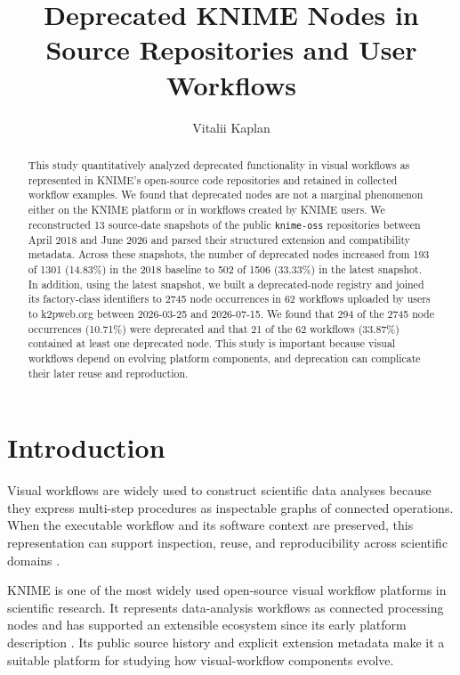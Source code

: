 \documentclass[runningheads]{llncs}
\title{Deprecated KNIME Nodes in Source Repositories and User Workflows}
\author{Vitalii Kaplan\orcidID{0009-0009-8181-2863}}
\institute{\email{2333275007@alu.istinye.edu.tr}}
\begin{document}
\maketitle

\begin{abstract}
This study quantitatively analyzed deprecated functionality in visual
workflows as represented in KNIME's open-source code repositories and retained
in collected workflow examples. We found that deprecated
nodes are not a marginal phenomenon either on the KNIME platform or in
workflows created by KNIME users. We
reconstructed 13 source-date snapshots of the public \texttt{knime-oss}
repositories between April 2018 and June 2026 and parsed their structured
extension and compatibility metadata. Across these snapshots, the number of
deprecated nodes increased from 193 of 1301 (14.83\%) in the 2018
baseline to 502 of 1506 (33.33\%) in the latest snapshot. In addition, using the
latest snapshot, we built a deprecated-node registry and joined its factory-class
identifiers to 2745 node occurrences in 62 workflows uploaded by users to
k2pweb.org between 2026-03-25 and 2026-07-15. We found that 294 of the 2745 node
occurrences (10.71\%) were deprecated and that 21 of the 62 workflows (33.87\%)
contained at least one deprecated node.
This study is important because visual workflows
depend on evolving platform components, and deprecation can complicate their
later reuse and reproduction.

\end{abstract}

\section{Introduction}

Visual workflows are widely used to construct scientific data analyses because
they express multi-step procedures as inspectable graphs of connected
operations. When the executable workflow and its software context are
preserved, this representation can support inspection, reuse, and
reproducibility across scientific domains
\cite{Liew2017Workflows,Ludascher2009Automation,Fu2025GIScienceKNIME,KaplanKNIMEWorkflowAudit2026}.

KNIME is one of the most widely used open-source visual workflow platforms in
scientific research. It represents data-analysis workflows as connected
processing nodes and has supported an extensible ecosystem since its early
platform description \cite{Berthold2009KNIME,KNIMEUserGuide2026}. Its public
source history and explicit extension metadata make it a suitable platform for
studying how visual-workflow components evolve.
\end{document}
